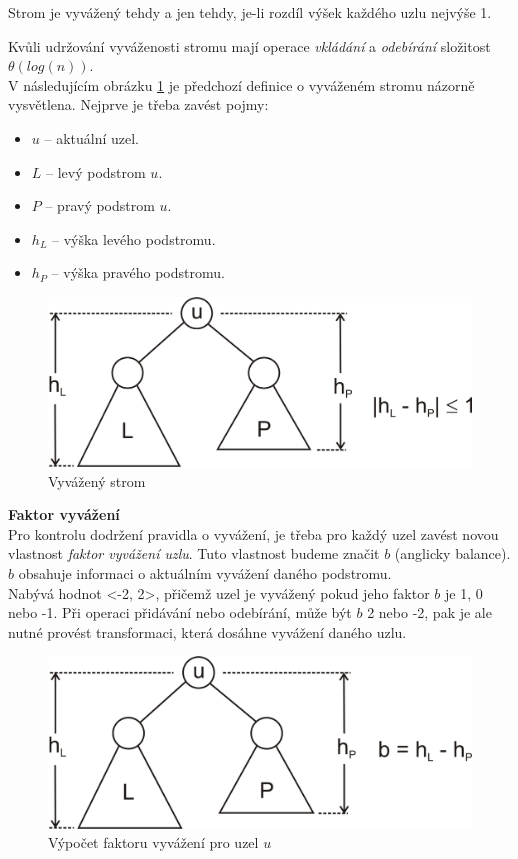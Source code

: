 \documentclass[
  biblatex=false,
  font=serif,
  glossaries=false,
  tables=false,
  theorems=false,
  index
]{kidiplom}
\begin{document}
\begin{definition}
Strom je vyvážený tehdy a jen tehdy, je-li rozdíl výšek každého uzlu nejvýše 1.\cite{Adelson}\cite{dvorsky}
\end{definition}

\noindent Kvůli udržování vyváženosti stromu mají operace \textit{vkládání} a \textit{odebírání} složitost $\theta(log (n))$.\\
\newpage
\noindent V následujícím obrázku \ref{vyvazenyStrom} je předchozí definice o vyváženém stromu názorně vysvětlena. Nejprve je třeba zavést pojmy:
\begin{itemize}
\item $u$ -- aktuální uzel.
\item $L$ -- levý podstrom $u$.
\item $P$ -- pravý podstrom $u$.
\item $h_L$ -- výška levého podstromu.
\item $h_P$ -- výška pravého podstromu.
\end{itemize}

\begin{figure}[h!]
\centering
	\includegraphics[scale=0.3]{obrazky/8AVLVyvazenyStrom.png}
	\caption{Vyvážený strom}
	\label{vyvazenyStrom}
\end{figure}

\noindent\textbf{Faktor vyvážení}\\
\indent Pro kontrolu dodržení pravidla o vyvážení, je třeba pro každý uzel zavést novou vlastnost \textit{faktor vyvážení uzlu}. Tuto vlastnost budeme značit $b$ (anglicky balance). $b$ obsahuje informaci o aktuálním vyvážení daného podstromu.\\ 
\indent Nabývá hodnot <-2, 2>, přičemž uzel je vyvážený pokud jeho faktor $b$ je 1, 0 nebo -1. Při operaci přidávání nebo odebírání, může být $b$ 2 nebo -2, pak je ale nutné provést transformaci, která dosáhne vyvážení daného uzlu.

\begin{figure}[h!]
\centering
	\includegraphics[scale=0.3]{obrazky/9AVLFaktor.png}
	\caption{Výpočet faktoru vyvážení pro uzel $u$}
\end{figure}
\end{document}
